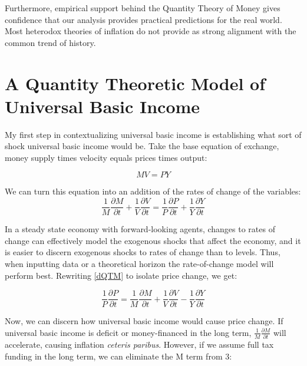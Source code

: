 \documentclass[paper=a4, fontsize=11pt,twoside]{scrartcl}
\begin{document}
Furthermore, empirical support behind the Quantity Theory of Money\autocites{candleweb}{10.2307/1805778}{RePEc:fip:fedmwp:89164} gives confidence that our analysis provides practical predictions for the real world. Most heterodox theories of inflation do not provide as strong alignment with the common trend of history. 

\section{A Quantity Theoretic Model of Universal Basic Income} 

My first step in contextualizing universal basic income is establishing what sort of shock universal basic income would be. Take the base equation of exchange, money supply times velocity equals prices times output:

\begin{equation}
MV = PY
\end{equation}

We can turn this equation into an addition of the rates of change of the variables\autocite{friedman:restatement, friedman:quantity}:
\begin{equation}
\frac{1}{M}\frac{\partial M}{\partial t} + \frac{1}{V}\frac{\partial V}{\partial t} = \frac{1}{P}\frac{\partial P}{\partial t} + \frac{1}{Y}\frac{\partial Y}{\partial t}
\label{dQTM}
\end{equation}

In a steady state economy with forward-looking agents, changes to rates of change can effectively model the exogenous shocks that affect the economy, and it is easier to discern exogenous shocks to rates of change than to levels. Thus, when inputting data or a theoretical horizon the rate-of-change model will perform best. Rewriting \ref{dQTM} to isolate price change, we get:

\begin{equation}
\frac{1}{P}\frac{\partial P}{\partial t} = \frac{1}{M}\frac{\partial M}{\partial t} + \frac{1}{V}\frac{\partial V}{\partial t} - \frac{1}{Y}\frac{\partial Y}{\partial t}
\end{equation}

Now, we can discern how universal basic income would cause price change. If universal basic income is deficit or money-financed in the long term, $\frac{1}{M}\frac{\partial M}{\partial t}$ will accelerate, causing inflation \textit{ceteris paribus}. However, if we assume full tax funding in the long term, we can eliminate the M term from 3:
\end{document}

